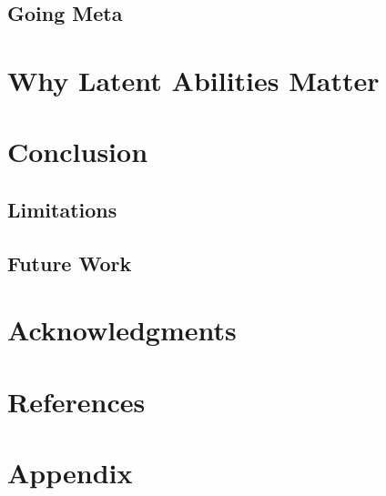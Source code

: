 \documentclass{article}
\begin{document}
\subsection{Going Meta}


\section{Why Latent Abilities Matter}


\section{Conclusion}
\subsection{Limitations}

\subsection{Future Work}

\section*{Acknowledgments}
\section*{References}
\section*{Appendix}
\end{document}
